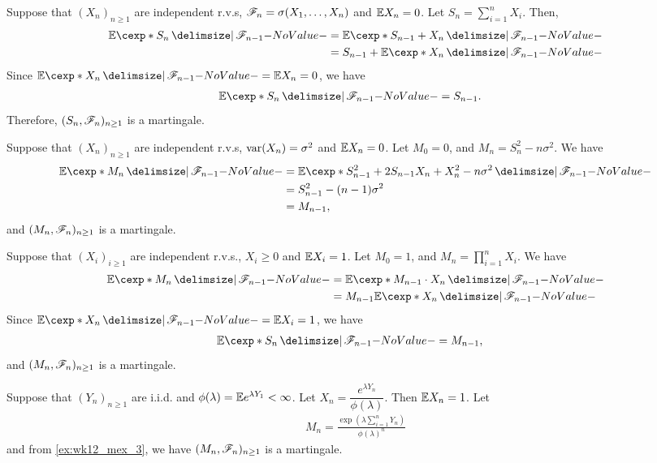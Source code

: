 \documentclass[12pt]{article}
\begin{document}
\begin{Example}\label{ex:wk12_mex_1}
Suppose that $(X_n)_{n\geq1}$ are independent r.v.s, $\mathscr{F}_n=\sigma(X_1,\ldots,X_n)$ and $\E X_n=0$. Let $S_n=\sum_{i=1}^n X_i$. Then,
\begin{align*}
\E [S_n \given \scF_{n-1}]&= \E [S_{n-1}+X_n \given \scF_{n-1}]\\
&=S_{n-1}+\E [X_n \given \scF_{n-1}]
\end{align*}
Since $\E [X_n \given \scF_{n-1}] = \E X_n =0$, we have
\begin{align*}
\E [S_n \given \scF_{n-1}]&=S_{n-1}.
\end{align*}
Therefore, $(S_{n},\mathscr{F}_n)_{n\geq1}$ is a martingale.
\end{Example}

\begin{Example}\label{ex:wk12_mex_2}
Suppose that $(X_n)_{n\geq1}$ are independent r.v.s, $\operatorname{var}(X_n)=\sigma^2$ and $\E X_n=0$. Let $M_0=0$, and $M_n=S_n^2-n\sigma^2$. We have
\begin{align*}
\E[M_n \given \scF_{n-1}]
&= \E[S_{n-1}^2 + 2S_{n-1}X_n + X_n^2 - n\sigma^2  \given  \scF_{n-1}]\\
&= S_{n-1}^2 - (n-1)\sigma^2\\
&= M_{n-1},
\end{align*}
and $(M_{n},\mathscr{F}_n)_{n\geq1}$ is a martingale.
\end{Example}

\begin{Example}\label{ex:wk12_mex_3}
Suppose that $(X_i)_{i\geq1}$ are independent r.v.s., $X_i\geq 0$ and $\E X_i=1$. Let $M_0=1$, and $M_n=\prod_{i=1}^n X_i$. We have
\begin{align*}
\E [M_n \given \scF_{n-1}]&= \E [M_{n-1}\cdot X_n \given \scF_{n-1}]\\
&=M_{n-1} \E [X_n \given \scF_{n-1}]
\end{align*}
Since $\E [X_n \given \scF_{n-1}] = \E X_i =1$, we have
\begin{align*}
\E [S_n \given \scF_{n-1}]&=M_{n-1},
\end{align*}
and $(M_{n},\mathscr{F}_n)_{n\geq1}$ is a martingale. 
\end{Example}


\begin{Example}\label{ex:wk12_mex_4}
Suppose that $(Y_n)_{n\geq1}$ are i.i.d. and $\phi(\lambda)=\E e^{\lambda Y_1}<\infty$. Let $X_n=\dfrac{e^{\lambda Y_n}}{\phi(\lambda)}$. Then $\E X_n=1$. Let 
\begin{align*}
M_n=\frac{\exp{(\lambda \sum_{i=1}^n Y_n)}}{\phi(\lambda)^n}
\end{align*} 
and from \cref{ex:wk12_mex_3}, we have $(M_{n},\mathscr{F}_n)_{n\geq1}$ is a martingale.
\end{Example}
\end{document}
